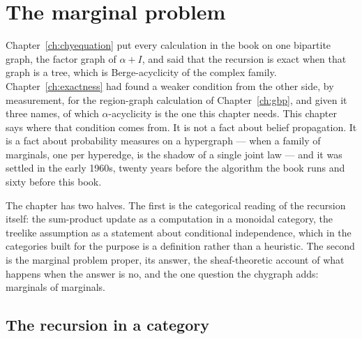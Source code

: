 \chapter{The marginal problem}
\label{ch:marginal}


Chapter~\ref{ch:chyequation} put every calculation in the book on one
bipartite graph, the factor graph of $\alpha+I$, and said that the recursion
is exact when that graph is a tree, which is Berge-acyclicity of the
complex family. Chapter~\ref{ch:exactness} had found a weaker condition
from the other side, by measurement, for the region-graph calculation of
Chapter~\ref{ch:gbp}, and given it three names, of which
$\alpha$-acyclicity is the one this chapter needs. This chapter says where
that condition comes from. It is not a fact
about belief propagation. It is a fact about probability measures on a
hypergraph --- when a family of marginals, one per hyperedge, is the shadow of
a single joint law --- and it was settled in the early 1960s, twenty years
before the algorithm the book runs and sixty before this book.

The chapter has two halves. The first is the categorical reading of the
recursion itself: the sum-product update as a computation in a monoidal
category, the treelike assumption as a statement about conditional
independence, which in the categories built for the purpose is a definition
rather than a heuristic. The second is the marginal problem proper, its
answer, the sheaf-theoretic account of what happens when the answer is no,
and the one question the chygraph adds: marginals of marginals.

\section{The recursion in a category}
\label{sec:mg-category}

